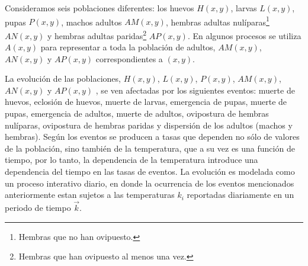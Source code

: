 Consideramos seis poblaciones diferentes: los huevos $H(x,y)$, larvas $L(x,y)$, pupas $P(x,y)$,
machos adultos $AM(x,y)$, hembras adultas nulíparas\footnote{Hembras que no han ovipuesto.}
$AN(x,y)$ y hembras adultas paridas\footnote{Hembras que han ovipuesto al menos una vez.} $AP(x,y)$. En algunos procesos se utiliza $A(x, y)$ para representar a toda la población de adultos,
$AM(x,y)$, $AN(x,y)$ y $AP(x,y)$ correspondientes a $(x, y)$.

La evolución de las poblaciones, $H(x,y)$, $L(x,y)$, $P(x,y)$, $AM(x,y)$, $AN(x,y)$ y $AP(x,y)$ ,
se ven afectadas por los siguientes eventos: muerte de huevos, eclosión de huevos, muerte de
larvas, emergencia de pupas, muerte de pupas, emergencia de adultos, muerte de adultos, ovipostura
de hembras nulíparas, ovipostura de hembras paridas y dispersión de los adultos (machos y hembras).
Según \cite{otero2006stochastic} los eventos se producen a tasas que dependen no sólo de valores
de la población, sino también de la temperatura, que a su vez es una función de tiempo, por lo
tanto, la dependencia de la temperatura introduce una dependencia del tiempo en las tasas de
eventos. La evolución es modelada como un proceso interativo diario, en donde la ocurrencia de los
eventos mencionados anteriormente estan sujetos a las temperaturas $k_{i}$ reportadas diariamente
en un periodo de tiempo $\vec{k}$.








